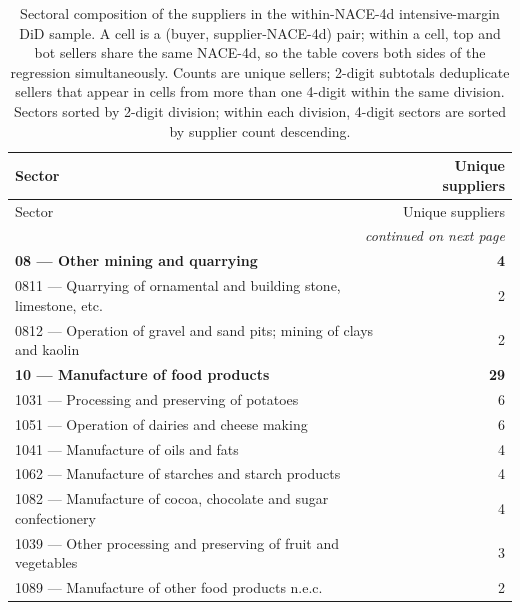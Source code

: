 \begin{longtable}{lr}
\caption{Sectoral composition of the suppliers in the within-NACE-4d intensive-margin DiD sample. A cell is a (buyer, supplier-NACE-4d) pair; within a cell, top and bot sellers share the same NACE-4d, so the table covers both sides of the regression simultaneously. Counts are unique sellers; 2-digit subtotals deduplicate sellers that appear in cells from more than one 4-digit within the same division. Sectors sorted by 2-digit division; within each division, 4-digit sectors are sorted by supplier count descending.}\label{tab:phase4_within_intensive_sector_list} \\
\toprule
Sector & Unique suppliers \\
\midrule
\endfirsthead
\toprule
Sector & Unique suppliers \\
\midrule
\endhead
\midrule
\multicolumn{2}{r}{\textit{continued on next page}} \\
\endfoot
\bottomrule
\endlastfoot
\addlinespace[2pt]\textbf{08 --- Other mining and quarrying} & \textbf{4} \\
\hspace{1em}0811 --- Quarrying of ornamental and building stone, limestone, etc. & 2 \\
\hspace{1em}0812 --- Operation of gravel and sand pits; mining of clays and kaolin & 2 \\
\addlinespace[2pt]\textbf{10 --- Manufacture of food products} & \textbf{29} \\
\hspace{1em}1031 --- Processing and preserving of potatoes & 6 \\
\hspace{1em}1051 --- Operation of dairies and cheese making & 6 \\
\hspace{1em}1041 --- Manufacture of oils and fats & 4 \\
\hspace{1em}1062 --- Manufacture of starches and starch products & 4 \\
\hspace{1em}1082 --- Manufacture of cocoa, chocolate and sugar confectionery & 4 \\
\hspace{1em}1039 --- Other processing and preserving of fruit and vegetables & 3 \\
\hspace{1em}1089 --- Manufacture of other food products n.e.c. & 2 \\

\end{longtable}

